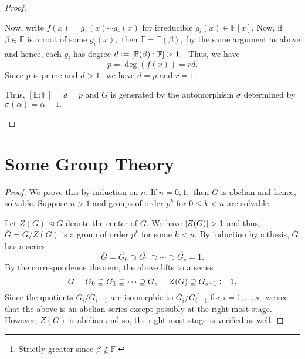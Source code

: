 \begin{proof}
\begin{enumerate}
        Now, write $f(x) = g_1(x) \cdots g_r(x)$ for irreducible $g_i(x) \in \mathbb{F}[x].$ Now, if $\beta \in \mathbb{E}$ is a root of some $g_i(x),$ then $\mathbb{E} = \mathbb{F}(\beta),$ by the same argument as above and hence, each $g_i$ has degree $d \vcentcolon= [\mathbb{F}(\beta) : \mathbb{F}] > 1.$\footnote{Strictly greater since $\beta \notin \mathbb{F}.$} Thus, we have
        \begin{equation*} 
            p = \deg(f(x)) = rd.
        \end{equation*}
        Since $p$ is prime and $d > 1,$ we have $d = p$ and $r = 1.$

        Thus, $[\mathbb{E} : \mathbb{F}] = d = p$ and $G$ is generated by the automorphism $\sigma$ determined by $\sigma(\alpha) = \alpha + 1.$ \qedhere
    \end{enumerate}
\end{proof}

\section{Some Group Theory}

\pgroupssolvable*\label{prop:pgroupssolvable2}
\begin{flushright}\hyperref[prop:pgroupssolvable]{\upsym}\end{flushright}
\begin{proof}
    We prove this by induction on $n.$ If $n = 0, 1,$ then $G$ is abelian and hence, solvable. Suppose $n > 1$ and groups of order $p^{k}$ for $0 \le k < n$ are solvable.

    Let $Z(G) \unlhd G$ denote the center of $G.$ We have $\md{Z(G)} > 1$ and thus, $\overline{G} = G/Z(G)$ is a group of order $p^k$ for some $k < n.$ By induction hypothesis, $\overline{G}$ has a series
    \begin{equation*} 
        \overline{G} = \overline{G_0} \supset \overline{G_1} \supset \cdots \supset \overline{G_{s}} = 1.
    \end{equation*}
    By the correspondence theorem, the above lifts to a series
    \begin{equation*} 
        G = G_0 \supset G_1 \supset \cdots \supset G_{s} = Z(G) \supset G_{s + 1} \vcentcolon= 1.
    \end{equation*}
    Since the quotients $G_i/G_{i - 1}$ are isomorphic to $\overline{G_i}/\overline{G_{i - 1}}$ for $i = 1, \ldots, s,$ we see that the above is an abelian series except possibly at the right-most stage. However, $Z(G)$ is abelian and so, the right-most stage is verified as well.
\end{proof}

